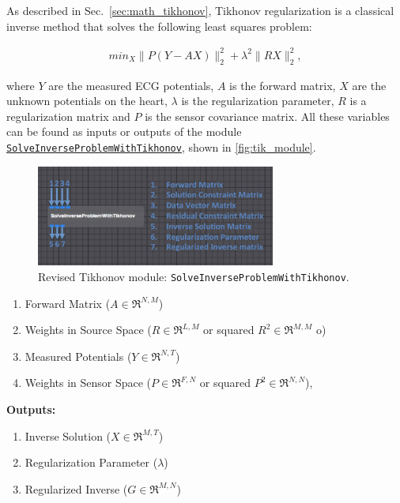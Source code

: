     As described in Sec.~\ref{sec:math_tikhonov}, Tikhonov regularization is a classical inverse method that solves the following least squares problem:
    \begin{center}
        \begin{eqnarray}
            min_{X} \| P (Y - A X) \|^{2}_{2} + \lambda^{2} \| RX \|^{2}_{2},
        \label{eq:inverseSec_tik_problem}
        \end{eqnarray}
    \end{center}
    where $Y$ are the measured ECG potentials, $A$ is the forward matrix, $X$ are the unknown potentials on the heart, $\lambda$ is the regularization parameter, $R$ is a regularization matrix and $P$ is the sensor covariance matrix.
    All these variables can be found as inputs or outputs of the module \href{http://scirundocwiki.sci.utah.edu/SCIRunDocs/index.php/CIBC:Documentation:SCIRun:Reference:BioPSE:SolveInverseProblemWithTikhonov}{{\tt SolveInverseProblemWithTikhonov}}, shown in \autoref{fig:tik_module}.
    \begin{figure}
        \begin{center}
        \includegraphics[width=0.7\textwidth]{ECGToolkitGuide_figures/tik1.png}
        \caption{Revised Tikhonov module: {\tt SolveInverseProblemWithTikhonov}.  }
        \label{fig:tik_module}
        \end{center}
    \end{figure}
    \begin{enumerate}
        \item Forward Matrix ($A\in\Re^{N,M}$)
        \item Weights in Source Space ($R\in\Re^{L,M}$ or squared $R^2\in\Re^{M,M}$ o)
        \item Measured Potentials ($Y\in\Re^{N,T}$)
        \item Weights in Sensor Space ($P\in\Re^{F,N}$ or squared $P^2\in\Re^{N,N}$),
    \end{enumerate}
    {\bf Outputs:}
     \begin{enumerate}
        \item Inverse Solution ($X\in\Re^{M,T}$)
        \item Regularization Parameter ($\lambda$)
        \item Regularized Inverse ($G\in\Re^{M,N}$)
    \end{enumerate}

